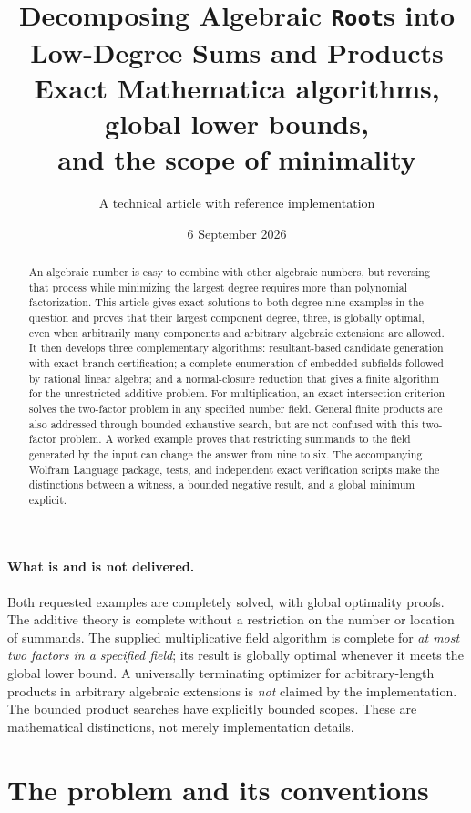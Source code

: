 \documentclass[11pt]{article}
\title{Decomposing Algebraic \texttt{Root}s into\\[2pt]
Low-Degree Sums and Products\\[7pt]
\large Exact Mathematica algorithms, global lower bounds,\\
and the scope of minimality}
\author{A technical article with reference implementation}
\date{6 September 2026}
\theoremstyle{definition}\newtheorem{definition}[theorem]{Definition}
\theoremstyle{remark}\newtheorem{remark}[theorem]{Remark}
\begin{document}
\maketitle
\begin{abstract}
An algebraic number is easy to combine with other algebraic numbers, but reversing
that process while minimizing the largest degree requires more than polynomial
factorization. This article gives exact solutions to both degree-nine examples
in the question and proves that their largest component degree, three, is globally
optimal, even when arbitrarily many components and arbitrary algebraic extensions
are allowed. It then develops three complementary algorithms: resultant-based
candidate generation with exact branch certification; a complete enumeration of
embedded subfields followed by rational linear algebra; and a normal-closure
reduction that gives a finite algorithm for the unrestricted additive problem.
For multiplication, an exact intersection criterion solves the two-factor problem
in any specified number field. General finite products are also addressed through
bounded exhaustive search, but are not confused with this two-factor problem.
A worked example proves that restricting summands to the field generated by the
input can change the answer from nine to six. The accompanying Wolfram Language
package, tests, and independent exact verification scripts make the distinctions
between a witness, a bounded negative result, and a global minimum explicit.
\end{abstract}

\paragraph{What is and is not delivered.}
Both requested examples are completely solved, with global optimality proofs.
The additive theory is complete without a restriction on the number or location
of summands. The supplied multiplicative field algorithm is complete for
\emph{at most two factors in a specified field}; its result is globally optimal
whenever it meets the global lower bound. A universally terminating optimizer for
arbitrary-length products in arbitrary algebraic extensions is \emph{not} claimed
by the implementation. The bounded product searches have explicitly bounded
scopes. These are mathematical distinctions, not merely implementation details.

\clearpage
\tableofcontents
\newpage

\section{The problem and its conventions}
\end{document}

